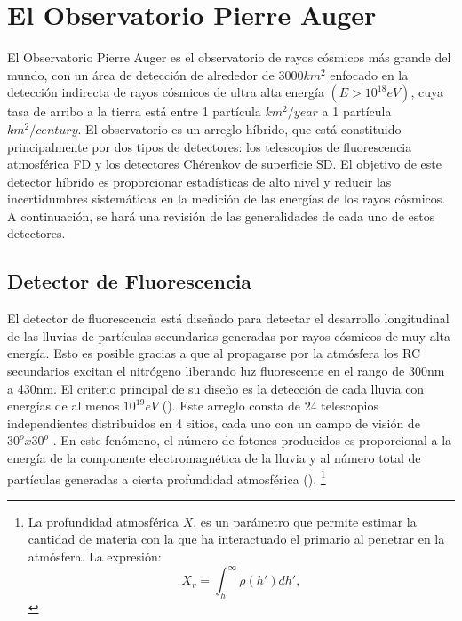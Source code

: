 \newpage
\newpage

\chapter{El Observatorio Pierre Auger}

El Observatorio Pierre Auger es el observatorio de rayos cósmicos más grande del mundo, con un área de detección de alrededor de  $3000 km^{2}$ enfocado en la detección indirecta de rayos cósmicos de ultra alta energía $(E > 10^{18} eV)$, cuya tasa de arribo a la tierra está entre 1 partícula $ km^{2}/year$ a 1 partícula $km^{2}/century$. El observatorio es un arreglo híbrido, que está constituido principalmente por dos tipos de detectores: los telescopios de fluorescencia atmosférica FD y los detectores Chérenkov de superficie SD. El objetivo de este detector híbrido es proporcionar estadísticas de alto nivel y reducir las incertidumbres sistemáticas en la medición de las energías de los rayos cósmicos. A continuación, se hará una revisión de las generalidades de cada uno de estos detectores.    

\section{Detector de Fluorescencia}
El detector de fluorescencia está diseñado para detectar el desarrollo longitudinal de las lluvias de partículas secundarias generadas por rayos cósmicos de muy alta energía. Esto es posible gracias a que al propagarse por la atmósfera los RC secundarios excitan el nitrógeno liberando luz fluorescente en el rango de 300nm a 430nm. El criterio principal de su diseño es la detección de cada lluvia con energías de al menos $10^{19}eV$ (\cite{Aab_2015}). Este arreglo consta de 24 telescopios independientes distribuidos en 4 sitios, cada uno con un campo de visión de $30^o x 30^o$ . En este fenómeno, el número de fotones producidos es proporcional a la energía de la componente electromagnética de la lluvia y al número total de partículas generadas a cierta profundidad atmosférica (\cite{asorey}). \footnote{La profundidad atmosférica $X$, es un parámetro que permite estimar la cantidad de materia con la que ha interactuado el primario al penetrar en la atmósfera. La expresión:
\begin{equation}
X_{v}= \int_{h}^{\infty} \rho (h') dh',
\label{integral}
\end{equation}
}

